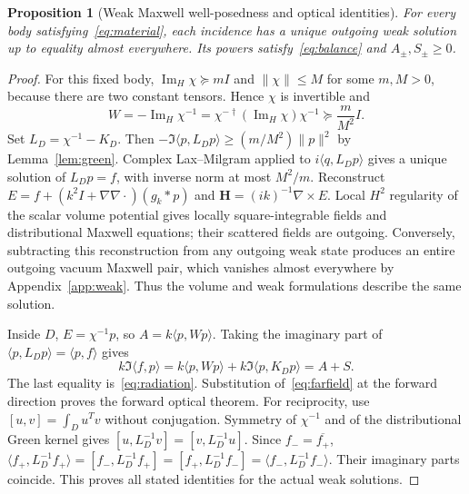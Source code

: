 \documentclass[11pt]{article}
\newtheorem{proposition}[theorem]{Proposition}
\newcommand{\ImH}{\operatorname{Im}_{\!H}}
\newcommand{\ip}[2]{\langle #1,#2\rangle}
\newcommand{\norm}[1]{\lVert #1\rVert}
\begin{document}
\begin{proposition}[Weak Maxwell well-posedness and optical identities]\label{prop:physical}
For every body satisfying~\eqref{eq:material}, each incidence has a unique outgoing weak solution up to equality almost everywhere. Its powers satisfy~\eqref{eq:balance} and $A_\pm,S_\pm\geq0$.
\end{proposition}
\begin{proof}
For this fixed body, $\ImH\chi\succeq mI$ and $\norm{\chi}\leq M$ for some $m,M>0$, because there are two constant tensors. Hence $\chi$ is invertible and
\begin{equation}\label{eq:tensor-coercivity}
 W=-\ImH\chi^{-1}=\chi^{-\dagger}(\ImH\chi)\chi^{-1}
 \succeq\frac{m}{M^2}I.
\end{equation}
Set $L_D=\chi^{-1}-K_D$. Then $-\Im\ip{p}{L_Dp}\geq(m/M^2)\norm{p}^2$ by Lemma~\ref{lem:green}. Complex Lax--Milgram applied to $i\ip{q}{L_Dp}$ gives a unique solution of $L_Dp=f$, with inverse norm at most $M^2/m$. Reconstruct $E=f+(k^2I+\nabla\nabla\cdot)(g_k*p)$ and $\mathbf H=(ik)^{-1}\nabla\times E$. Local $H^2$ regularity of the scalar volume potential gives locally square-integrable fields and distributional Maxwell equations; their scattered fields are outgoing. Conversely, subtracting this reconstruction from any outgoing weak state produces an entire outgoing vacuum Maxwell pair, which vanishes almost everywhere by Appendix~\ref{app:weak}. Thus the volume and weak formulations describe the same solution.

Inside $D$, $E=\chi^{-1}p$, so $A=k\ip{p}{Wp}$. Taking the imaginary part of $\ip{p}{L_Dp}=\ip{p}{f}$ gives
\begin{equation}\label{eq:work-balance}
 k\Im\ip{f}{p}=k\ip{p}{Wp}+k\Im\ip{p}{K_Dp}=A+S.
\end{equation}
The last equality is~\eqref{eq:radiation}. Substitution of~\eqref{eq:farfield} at the forward direction proves the forward optical theorem. For reciprocity, use $[u,v]=\int_Du^Tv$ without conjugation. Symmetry of $\chi^{-1}$ and of the distributional Green kernel gives $[u,L_D^{-1}v]=[v,L_D^{-1}u]$. Since $f_-=\overline{f_+}$, $\ip{f_+}{L_D^{-1}f_+}=[f_-,L_D^{-1}f_+]=[f_+,L_D^{-1}f_-]=\ip{f_-}{L_D^{-1}f_-}$. Their imaginary parts coincide. This proves all stated identities for the actual weak solutions.
\end{proof}
\end{document}
